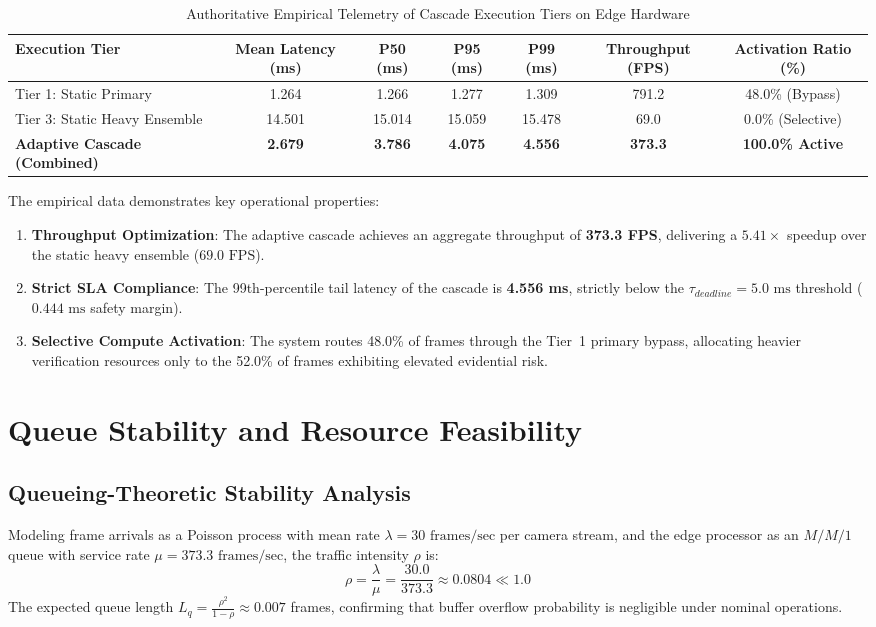 \documentclass[10pt,journal,compsoc]{IEEEtran}
\begin{document}
\begin{table}[t]
\caption{Authoritative Empirical Telemetry of Cascade Execution Tiers on Edge Hardware}
\label{tab:empirical_performance}
\centering
\begin{tabular}{lcccccc}
\toprule
\textbf{Execution Tier} & \textbf{Mean Latency (ms)} & \textbf{P50 (ms)} & \textbf{P95 (ms)} & \textbf{P99 (ms)} & \textbf{Throughput (FPS)} & \textbf{Activation Ratio (\%)} \\
\midrule
Tier 1: Static Primary & 1.264 & 1.266 & 1.277 & 1.309 & 791.2 & 48.0\% (Bypass) \\
Tier 3: Static Heavy Ensemble & 14.501 & 15.014 & 15.059 & 15.478 & 69.0 & 0.0\% (Selective) \\
\midrule
\textbf{Adaptive Cascade (Combined)} & \textbf{2.679} & \textbf{3.786} & \textbf{4.075} & \textbf{4.556} & \textbf{373.3} & \textbf{100.0\% Active} \\
\bottomrule
\end{tabular}
\end{table}

The empirical data demonstrates key operational properties:
\begin{enumerate}
    \item \textbf{Throughput Optimization}: The adaptive cascade achieves an aggregate throughput of \textbf{373.3 FPS}, delivering a $5.41\times$ speedup over the static heavy ensemble ($69.0\text{ FPS}$).
    \item \textbf{Strict SLA Compliance}: The 99th-percentile tail latency of the cascade is \textbf{4.556 ms}, strictly below the $\tau_{deadline} = 5.0\text{ ms}$ threshold ($0.444\text{ ms}$ safety margin).
    \item \textbf{Selective Compute Activation}: The system routes 48.0\% of frames through the Tier~1 primary bypass, allocating heavier verification resources only to the 52.0\% of frames exhibiting elevated evidential risk.
\end{enumerate}

\section{Queue Stability and Resource Feasibility}

\subsection{Queueing-Theoretic Stability Analysis}
Modeling frame arrivals as a Poisson process with mean rate $\lambda = 30\text{ frames/sec}$ per camera stream, and the edge processor as an $M/M/1$ queue with service rate $\mu = 373.3\text{ frames/sec}$, the traffic intensity $\rho$ is:
\begin{equation}
\rho = \frac{\lambda}{\mu} = \frac{30.0}{373.3} \approx 0.0804 \ll 1.0
\end{equation}
The expected queue length $L_q = \frac{\rho^2}{1 - \rho} \approx 0.007$ frames, confirming that buffer overflow probability is negligible under nominal operations.
\end{document}
